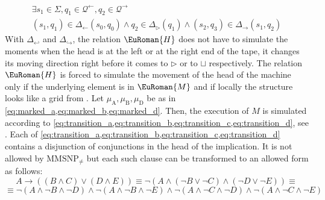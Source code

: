 \documentclass[10pt,a4paper]{amsart}
\theoremstyle{plain}
\theoremstyle{definition}
\numberwithin{equation}{section}
\newcommand{\eurm}[1]{\EuRoman{#1}} %
\newcommand{\euca}[1]{\mathcal{#1}} %
\newcommand{\rel}[1]{\eurm{#1}} %
\newcommand{\family}[1]{\euca{#1}} %
\newcommand{\MMSNPineq}[0]{\ensuremath{\textrm{MMSNP}_{\not=}}}
\begin{document}
\begin{multline}
\exists s_1\in\Sigma,q_1\in\family{Q}^\leftarrow,q_2\in\family{Q}^\rightarrow \\ (s_1,q_1)\in\Delta_\leftarrow(s_0,q_0)\wedge q_2\in\Delta_\triangleright(q_1)\wedge (s_2, q_3)\in\Delta_\rightarrow(s_1,q_2)
\end{multline}
With $\Delta_{\hookleftarrow}$ and $\Delta_{\hookrightarrow}$, the relation $\rel{H}$ does not have to simulate the moments when the head is at the left or at the right end of the tape, it changes its moving direction right before it comes to $\triangleright$ or to $\sqcup$ respectively.
The relation $\rel{H}$ is forced to simulate the movement of the head of the machine only if the underlying element is in $\rel{M}$ and if locally the structure looks like a grid from .
Let $\mu_\mathrm{A},\mu_\mathrm{B},\mu_\mathrm{D}$ be as in \cref{eq:marked_a,eq:marked_b,eq:marked_d}.
Then, the execution of $M$ is simulated according to \cref{eq:transition_a,eq:transition_b,eq:transition_c,eq:transition_d}, see .
Each of \cref{eq:transition_a,eq:transition_b,eq:transition_c,eq:transition_d} contains a disjunction of conjunctions in the head of the implication.
It is not allowed by $\MMSNPineq$ but each such clause can be transformed to an allowed form as follows:
\begin{equation*}
A\rightarrow ((B\wedge C)\vee (D\wedge E))\equiv \neg(A\wedge (\neg B\vee \neg C)\wedge(\neg D\vee\neg E))\equiv
\end{equation*}
\begin{equation*}
\equiv \neg(A\wedge \neg B\wedge \neg D)\wedge\neg(A\wedge \neg B\wedge \neg E)\wedge\neg(A\wedge \neg C\wedge \neg D)\wedge\neg(A\wedge \neg C\wedge \neg E)
\end{equation*}
\end{document}
